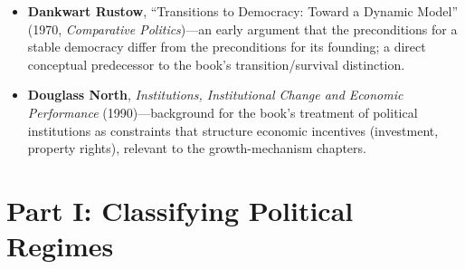 \documentclass[12pt]{article}
\begin{document}
\begin{itemize}[leftmargin=*, itemsep=4pt]
    \item \textbf{Dankwart Rustow}, ``Transitions to Democracy: Toward a Dynamic Model'' (1970, \textit{Comparative Politics})---an early argument that the preconditions for a stable democracy differ from the preconditions for its founding; a direct conceptual predecessor to the book's transition/survival distinction.
    \item \textbf{Douglass North}, \textit{Institutions, Institutional Change and Economic Performance} (1990)---background for the book's treatment of political institutions as constraints that structure economic incentives (investment, property rights), relevant to the growth-mechanism chapters.
\end{itemize}

\section{Part I: Classifying Political Regimes}
\end{document}
